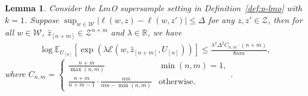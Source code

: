 \documentclass[onecolumn,romanappendices,10pt]{IEEEtran}
\newtheorem{lemma}{Lemma}
\newcommand{\Ecal}{{\mathcal E}}
\newcommand{\Wcal}{{\mathcal W}}
\newcommand{\Zcal}{{\mathcal Z}}
\newcommand{\EE}{{\mathbb{E}}}
\newcommand{\RR}{{\mathbb{R}}}
\begin{document}
	\begin{lemma} \label{lem:ub-cgf}
		Consider the L$m$O supersample setting in Definition~\ref{def:p-lmo} with $k=1$. Suppose $\sup_{w \in \Wcal} |\ell(w, z) - \ell(w, z')| \leq \Delta$ for any $z, z' \in \Zcal$, then for all $w \in \Wcal$, $\hat{z}_{[n+m]} \in \Zcal^{n+m}$ and $\lambda \in \RR$, we have
		\begin{align}
			\log \EE_{U_{[n]}} \left[ \exp \left( \lambda \Ecal\left( w, \hat{z}_{[n+m]}, U_{[n]} \right) \right) \right] \leq \frac{\lambda^2 \Delta^2 C_{n,m} \cdot (n+m)}{8nm},
			\label{eq:ub-cgf}
		\end{align}
		where $C_{n,m} = \begin{cases}
			\frac{n+m}{\max(n, m)} &  \min(n, m) = 1, \\
			\frac{n+m}{n+m-1} \cdot \frac{nm}{nm - \min(n, m)} & \text{otherwise.}
		\end{cases}$.
	\end{lemma}
	
\end{document}
